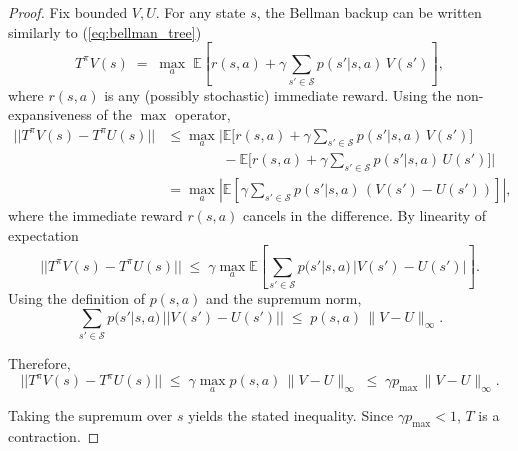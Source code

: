 \documentclass[10pt,a4paper]{amsart}
\begin{document}
\begin{proof}
Fix bounded $V,U$. For any state $s$, the Bellman backup can be written similarly to (\ref{eq:bellman_tree})
\begin{equation}\label{eq:bellman_tvs}
T^{\pi}V(s) \;=\; \max_{a}\;
\mathbb{E}\!\left[
r(s,a) + \gamma \sum_{s' \in \mathcal{S}}p(s'|s, a)\, V(s')
\right],
\end{equation}
where $r(s,a)$ is any (possibly stochastic) immediate reward. Using the non-expansiveness of the $\max$ operator,
\begin{equation}
\begin{aligned}
|| T^{\pi}V(s) - T^{\pi}U(s) ||
&\le \max_a
\Big|
\mathbb{E}\big[ r(s,a) + \gamma \textstyle\sum_{s' \in \mathcal{S}}p(s'|s, a)\, V(s')\big] \\
&\qquad\qquad - \mathbb{E}\big[ r(s,a) + \gamma \textstyle\sum_{s' \in \mathcal{S}}p(s'|s, a)\, U(s')\big]
\Big| \\
&= \max_{a}
\left|
\mathbb{E}\!\left[
\gamma \sum_{s' \in \mathcal{S}}p(s'|s, a)\, (V(s')-U(s'))
\right]
\right|,
\end{aligned}
\end{equation}
where the immediate reward $r(s,a)$ cancels in the difference. By linearity of expectation %
\begin{equation}
|| T^{\pi}V(s) - T^{\pi}U(s) ||
\;\le\;
\gamma \max_{a}
\mathbb{E}\!\left[
\sum_{s' \in \mathcal{S}}p(s'|s, a)\, |V(s')-U(s')|
\right].
\end{equation}
Using the definition of $p(s,a)$ and the supremum norm,
\begin{equation}
\sum_{s' \in \mathcal{S}}p(s'|s, a)\, ||V(s')-U(s')||
\;\le\;
p(s,a)\, \|V-U\|_\infty.
\end{equation}

Therefore,
\begin{equation}
|| T^{\pi}V(s) - T^{\pi}U(s) ||
\;\le\;
\gamma \max_{a} p(s,a)\, \|V-U\|_\infty
\;\le\;
\gamma p_{\max}\, \|V-U\|_\infty.
\end{equation}

Taking the supremum over $s$ yields the stated inequality. Since $\gamma p_{\max} < 1$, $T$ is a contraction.
\end{proof}
\end{document}
